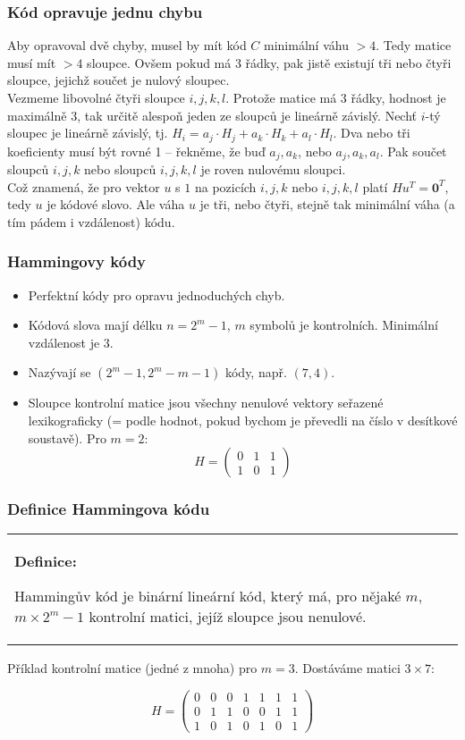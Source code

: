 \documentclass{beamer}
\newenvironment{definice}
{
    \begin{center}
    \begin{tabular}{p{9cm}}
    \textbf{Definice:}
}
{
    \end{tabular}
    \end{center}
}
\newcommand{\zero}{\textbf{0}}
\newcommand{\emptyline}{\\$\,$\\}
\newenvironment{itemizex}%
  {\large \begin{itemize}%
    \setlength{\itemsep}{8pt}%
    \setlength{\parskip}{8pt}}%
  {\end{itemize}}
\begin{document}
\begin{frame}[t,fragile]\frametitle{Kód opravuje jednu chybu} 
Aby opravoval dvě chyby, musel by mít kód $C$ minimální váhu $>4$. Tedy matice musí mít $>4$ sloupce. Ovšem pokud má 3 řádky, pak jistě existují tři nebo čtyři sloupce, jejichž součet je nulový sloupec.
\emptyline
Vezmeme libovolné čtyři sloupce $i, j, k, l$. Protože matice má 3 řádky, hodnost je maximálně 3, tak určitě alespoň jeden ze sloupců je lineárně závislý. Nechť $i$-tý sloupec je lineárně závislý, tj. $H_i=a_j\cdot H_j+a_k\cdot H_k+a_l\cdot H_l$. Dva nebo tři koeficienty musí být rovné 1 -- řekněme, že buď $a_j, a_k$, nebo $a_j, a_k, a_l$. Pak součet sloupců $i,j,k$ nebo sloupců $i,j,k,l$ je roven nulovému sloupci.
\emptyline
Což znamená, že pro vektor $u$ s $1$ na pozicích $i,j,k$ nebo $i,j,k,l$ platí $Hu^T=\zero^T$, tedy $u$ je kódové slovo. Ale váha $u$ je tři, nebo čtyři, stejně tak minimální váha (a tím pádem i vzdálenost) kódu. 
\end{frame}



\begin{frame}[t,fragile]\frametitle{Hammingovy kódy} 
    \begin{itemizex}
        \item Perfektní kódy pro opravu jednoduchých chyb.
        \item Kódová slova mají délku $n=2^m-1$, $m$ symbolů je kontrolních. Minimální vzdálenost je 3.
        \item Nazývají se $(2^m-1,2^m-m-1)$ kódy, např. $(7,4)$.
        \item Sloupce kontrolní matice jsou všechny nenulové vektory seřazené lexikograficky (= podle hodnot, pokud bychom je převedli na číslo v desítkové soustavě). Pro $m=2$:
$$
H=
\begin{pmatrix}
0&1&1\\
1&0&1
\end{pmatrix}
$$
    \end{itemizex}
\end{frame}


\begin{frame}[t,fragile]\frametitle{Definice Hammingova kódu} 
    \begin{definice}
Hammingův kód je binární lineární kód, který má, pro nějaké $m$, $m\times2^m-1$ kontrolní matici, jejíž sloupce jsou nenulové. 
    \end{definice}

    Příklad kontrolní matice (jedné z mnoha) pro $m=3$. Dostáváme matici $3\times7$:

$$H=
\begin{pmatrix}
0&0&0&1&1&1&1\\
0&1&1&0&0&1&1\\
1&0&1&0&1&0&1
\end{pmatrix}$$
\end{frame}
\end{document}
